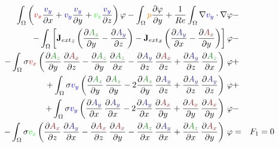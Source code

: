\documentclass[smallextended]{svjour3}       %
\begin{document}
\begin{eqnarray}
			\int_{\Omega} \left(\textcolor{red}{v_x} \frac{\textcolor{blue}{v_y}}{\partial x} + \textcolor{blue}{v_y} \frac{\textcolor{blue}{v_y}}{\partial y} + \textcolor{green}{v_z} \frac{\textcolor{blue}{v_y}}{\partial z}\right) \varphi
			- \int_{\Omega} \textcolor{orange}{p} \frac{\partial \varphi}{\partial y}
			+ \frac{1}{Re} \int_{\Omega} \nabla \textcolor{blue}{v_y} \cdot \nabla \varphi
			\nonumber & -\\
			- \int_{\Omega} \left[{\mathbf{J}_{ext}}_z \left(\frac{\partial \textcolor{darkGreen}{A_z}}{\partial y} - \frac{\partial \textcolor{darkBlue}{A_y}}{\partial z}\right) - {\mathbf{J}_{ext}}_x \left(\frac{\partial \textcolor{darkBlue}{A_y}}{\partial x} - \frac{\partial \textcolor{darkRed}{A_x}}{\partial y}\right)\right] \varphi			
			\nonumber & -\\
			- \int_{\Omega} \sigma \textcolor{red}{v_x} \left(\frac{\partial \textcolor{darkGreen}{A_z}}{\partial y}\,\frac{\partial \textcolor{darkRed}{A_x}}{\partial z} - \frac{\partial \textcolor{darkGreen}{A_z}}{\partial y}\,\frac{\partial \textcolor{darkGreen}{A_z}}{\partial x} - \frac{\partial \textcolor{darkBlue}{A_y}}{\partial z}\,\frac{\partial \textcolor{darkRed}{A_x}}{\partial z}  + \frac{\partial \textcolor{darkBlue}{A_y}}{\partial z}\,\frac{\partial \textcolor{darkGreen}{A_z}}{\partial x} \right)\, \varphi& +\nonumber \\			
			+ \int_{\Omega} \sigma \textcolor{blue}{v_y} \left(\frac{\partial \textcolor{darkGreen}{A_z}}{\partial y}\,\frac{\partial \textcolor{darkGreen}{A_z}}{\partial y} - 2 \frac{\partial \textcolor{darkGreen}{A_z}}{\partial y}\,\frac{\partial \textcolor{darkBlue}{A_y}}{\partial z} + \frac{\partial \textcolor{darkBlue}{A_y}}{\partial z}\,\frac{\partial \textcolor{darkBlue}{A_y}}{\partial z} \right)\, \varphi& +\nonumber \\			
			+ \int_{\Omega} \sigma \textcolor{blue}{v_y} \left(\frac{\partial \textcolor{darkBlue}{A_y}}{\partial x}\,\frac{\partial \textcolor{darkBlue}{A_y}}{\partial x} - 2 \frac{\partial \textcolor{darkBlue}{A_y}}{\partial x}\,\frac{\partial \textcolor{darkRed}{A_x}}{\partial y} + \frac{\partial \textcolor{darkRed}{A_x}}{\partial y}\,\frac{\partial \textcolor{darkRed}{A_x}}{\partial y} \right)\, \varphi& -\nonumber \\			
			- \int_{\Omega} \sigma \textcolor{green}{v_z} \left(\frac{\partial \textcolor{darkRed}{A_x}}{\partial z}\,\frac{\partial \textcolor{darkBlue}{A_y}}{\partial x} - \frac{\partial \textcolor{darkRed}{A_x}}{\partial z}\,\frac{\partial \textcolor{darkRed}{A_x}}{\partial y} - \frac{\partial \textcolor{darkGreen}{A_z}}{\partial x}\,\frac{\partial \textcolor{darkBlue}{A_y}}{\partial x}  + \frac{\partial \textcolor{darkGreen}{A_z}}{\partial x}\,\frac{\partial \textcolor{darkRed}{A_x}}{\partial y} \right)\, \varphi& = & F_1 = 0 \\			

\end{eqnarray}
\end{document}
